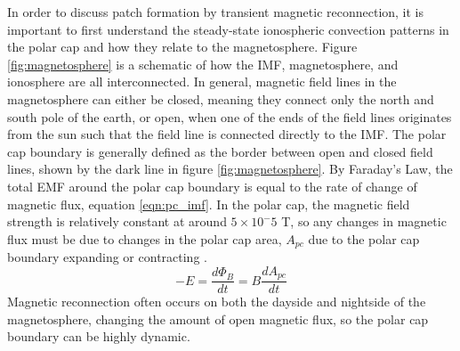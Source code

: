 In order to discuss patch formation by transient magnetic reconnection, it is important to first understand the steady-state ionospheric convection patterns in the polar cap and how they relate to the magnetosphere.  Figure \ref{fig:magnetosphere} is a schematic of how the IMF, magnetosphere, and ionosphere are all interconnected.  In general, magnetic field lines in the magnetosphere can either be closed, meaning they connect only the north and south pole of the earth, or open, when one of the ends of the field lines originates from the sun such that the field line is connected directly to the IMF.  The polar cap boundary is generally defined as the border between open and closed field lines, shown by the dark line in figure \ref{fig:magnetosphere}.  By Faraday's Law, the total EMF around the polar cap boundary is equal to the rate of change of magnetic flux, equation \ref{eqn:pc_imf}.  In the polar cap, the magnetic field strength is relatively constant at around \(5\times 10^-5\) T, so any changes in magnetic flux must be due to changes in the polar cap area, \(A_{pc}\) due to the polar cap boundary expanding or contracting \citep{Lockwood1992a}.
\begin{equation}
	\label{eqn:pc_imf}
	-E = \frac{d\Phi_B}{dt} = B\frac{dA_{pc}}{dt}
\end{equation}
Magnetic reconnection often occurs on both the dayside and nightside of the magnetosphere, changing the amount of open magnetic flux, so the polar cap boundary can be highly dynamic.

